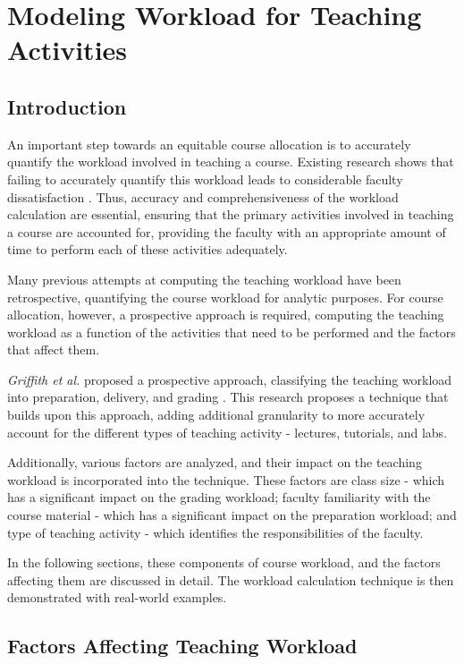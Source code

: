 \chapter{Modeling Workload for Teaching Activities}
\label{ch:teaching_workload}

\section{Introduction}

An important step towards an equitable course allocation is to accurately quantify the workload involved in teaching a course. Existing research shows that failing to accurately quantify this workload leads to considerable faculty dissatisfaction \cite{watts2011burnout}. Thus, accuracy and comprehensiveness of the workload calculation are essential, ensuring that the primary activities involved in teaching a course are accounted for, providing the faculty with an appropriate amount of time to perform each of these activities adequately.

Many previous attempts at computing the teaching workload have been retrospective, quantifying the course workload for analytic purposes. For course allocation, however, a prospective approach is required, computing the teaching workload as a function of the activities that need to be performed and the factors that affect them.

\textit{Griffith et al.} proposed a prospective approach, classifying the teaching workload into preparation, delivery, and grading \cite{griffith2020framework}. This research proposes a technique that builds upon this approach, adding additional granularity to more accurately account for the different types of teaching activity - lectures, tutorials, and labs.

Additionally, various factors are analyzed, and their impact on the teaching workload is incorporated into the technique. These factors are class size - which has a significant impact on the grading workload; faculty familiarity with the course material - which has a significant impact on the preparation workload; and type of teaching activity - which identifies the responsibilities of the faculty.

In the following sections, these components of course workload, and the factors affecting them are discussed in detail. The workload calculation technique is then demonstrated with real-world examples.

\section{Factors Affecting Teaching Workload}


